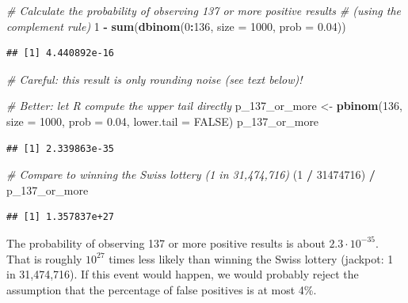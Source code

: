 \documentclass[
]{book}
\newenvironment{Shaded}{\begin{snugshade}}{\end{snugshade}}
\newcommand{\AttributeTok}[1]{\textcolor[rgb]{0.13,0.29,0.53}{#1}}
\newcommand{\CommentTok}[1]{\textcolor[rgb]{0.56,0.35,0.01}{\textit{#1}}}
\newcommand{\ConstantTok}[1]{\textcolor[rgb]{0.56,0.35,0.01}{#1}}
\newcommand{\DecValTok}[1]{\textcolor[rgb]{0.00,0.00,0.81}{#1}}
\newcommand{\FloatTok}[1]{\textcolor[rgb]{0.00,0.00,0.81}{#1}}
\newcommand{\FunctionTok}[1]{\textcolor[rgb]{0.13,0.29,0.53}{\textbf{#1}}}
\newcommand{\NormalTok}[1]{#1}
\newcommand{\OtherTok}[1]{\textcolor[rgb]{0.56,0.35,0.01}{#1}}
\newcommand{\SpecialCharTok}[1]{\textcolor[rgb]{0.81,0.36,0.00}{\textbf{#1}}}
\begin{document}
\begin{Shaded}
\begin{Highlighting}[]
\CommentTok{\# Calculate the probability of observing 137 or more positive results}
\CommentTok{\# (using the complement rule)}
\DecValTok{1} \SpecialCharTok{{-}} \FunctionTok{sum}\NormalTok{(}\FunctionTok{dbinom}\NormalTok{(}\DecValTok{0}\SpecialCharTok{:}\DecValTok{136}\NormalTok{, }\AttributeTok{size =} \DecValTok{1000}\NormalTok{, }\AttributeTok{prob =} \FloatTok{0.04}\NormalTok{))}
\end{Highlighting}
\end{Shaded}

\begin{verbatim}
## [1] 4.440892e-16
\end{verbatim}

\begin{Shaded}
\begin{Highlighting}[]
\CommentTok{\# Careful: this result is only rounding noise (see text below)!}

\CommentTok{\# Better: let R compute the upper tail directly}
\NormalTok{p\_137\_or\_more }\OtherTok{\textless{}{-}} \FunctionTok{pbinom}\NormalTok{(}\DecValTok{136}\NormalTok{, }\AttributeTok{size =} \DecValTok{1000}\NormalTok{, }\AttributeTok{prob =} \FloatTok{0.04}\NormalTok{, }\AttributeTok{lower.tail =} \ConstantTok{FALSE}\NormalTok{)}
\NormalTok{p\_137\_or\_more}
\end{Highlighting}
\end{Shaded}

\begin{verbatim}
## [1] 2.339863e-35
\end{verbatim}

\begin{Shaded}
\begin{Highlighting}[]
\CommentTok{\# Compare to winning the Swiss lottery (1 in 31,474,716)}
\NormalTok{(}\DecValTok{1} \SpecialCharTok{/} \DecValTok{31474716}\NormalTok{) }\SpecialCharTok{/}\NormalTok{ p\_137\_or\_more}
\end{Highlighting}
\end{Shaded}

\begin{verbatim}
## [1] 1.357837e+27
\end{verbatim}

The probability of observing 137 or more positive results is about \(2.3 \cdot 10^{-35}\).
That is roughly \(10^{27}\) times less likely than winning the Swiss lottery (jackpot: 1 in 31,474,716).
If this event would happen, we would probably reject the assumption that the percentage of false positives is at most 4\%.
\end{document}
